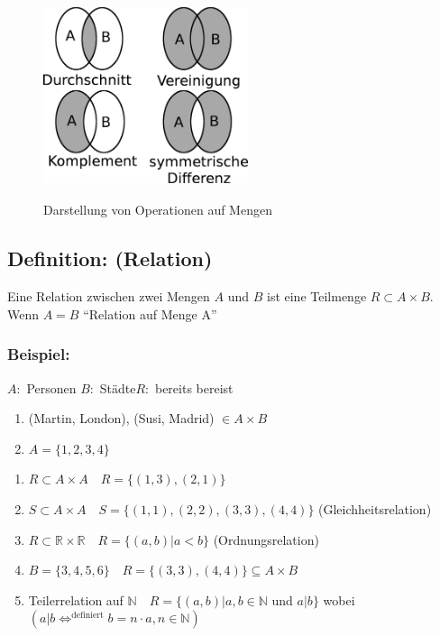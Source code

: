 \begin{figure} [H]
\centering 
\includegraphics[width=6cm, height=6cm]{mainmatter/chapter0/pics/durchschnitt.png}
\caption{Darstellung von Operationen auf Mengen} 
\end{figure}
%
%
%
\subsection{Definition: (Relation)}
Eine Relation zwischen zwei Mengen $A$ und $B$ ist eine Teilmenge $R \subset A \times B$. Wenn $A=B$ "`Relation auf Menge A"'\\
\subsubsection{Beispiel:}
$A:$ Personen \qquad $B:$ Städte\qquad $R:$ bereits bereist\\
\begin{enumerate}[label=\alph*)]
	\item (Martin, London), (Susi, Madrid) $\in A\times B$
	\item $A=\{1,2,3,4\}$
\end{enumerate}
\begin{enumerate}
	\item $R \subset A \times A \quad R=\{(1,3),(2,1)\}$
	\item $S \subset A \times A \quad S=\{(1,1),(2,2),(3,3),(4,4)\}$ (Gleichheitsrelation)
	\item $R \subset \mathbb{R}\times\mathbb{R} \quad R=\{(a,b)|a<b\}$ 
		(Ordnungsrelation)
	\item $B=\{3,4,5,6\} \quad R=\{(3,3),(4,4)\} \subseteq A\times B$
	\item Teilerrelation auf $\mathbb{N} \quad R=\{(a,b)|a,b\in\mathbb{N}$ und $a|b\} $ 
		wobei $(a|b \mathop{\Leftrightarrow}^{\text{definiert}} b=n\cdot a, n \in 
		\mathbb{N})$
\end{enumerate}
%
%
%
